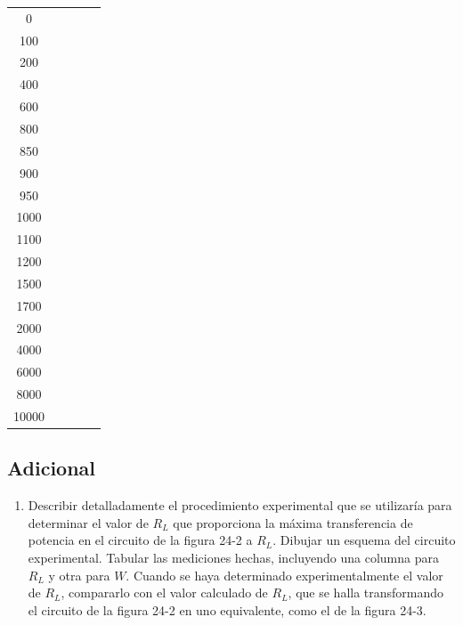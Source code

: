 \documentclass[12pt]{article}
\begin{document}
\centering
\begin{tabular}{
    S[table-format=5.0]
    S[table-format=5.0]
    S[table-format=1.3]
    S[table-format=2.3]
    S[table-format=2.3]
}
\toprule
{} &
{} &
{} &
{} &
{} \\
 & & & & \\
100 & & & & \\
200 & & & & \\
400 & & & & \\
600 & & & & \\
800 & & & & \\
850 & & & & \\
900 & & & & \\
950 & & & & \\
1000 & & & & \\
1100 & & & & \\
1200 & & & & \\
1500 & & & & \\
1700 & & & & \\
2000 & & & & \\
4000 & & & & \\
6000 & & & & \\
8000 & & & & \\
10000 & & & & \\
\bottomrule
\end{tabular}


\subsection*{Adicional}
\begin{enumerate}[start=10, label=\textbf{\arabic*.}]
    \item Describir detalladamente el procedimiento experimental que se utilizaría para determinar el valor de $R_L$ que proporciona la máxima transferencia de potencia en el circuito de la figura 24-2 a $R_L$. Dibujar un esquema del circuito experimental. Tabular las mediciones hechas, incluyendo una columna para $R_L$ y otra para $W$. Cuando se haya determinado experimentalmente el valor de $R_L$, compararlo con el valor calculado de $R_L$, que se halla transformando el circuito de la figura 24-2 en uno equivalente, como el de la figura 24-3.
\end{enumerate}
\end{document}
